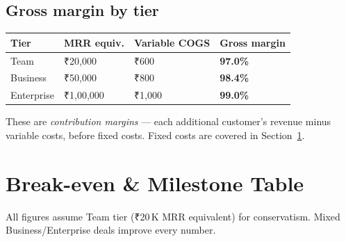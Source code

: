 \documentclass[12pt,a4paper]{article}
\begin{document}
\subsection{Gross margin by tier}

\begin{tabular}{@{}L{3.5cm}R{3cm}R{3.5cm}R{3cm}@{}}
  \toprule
  \textbf{Tier} & \textbf{MRR equiv.} & \textbf{Variable COGS} & \textbf{Gross margin} \\
  \midrule
  Team       & ₹20,000   & ₹600   & \textbf{97.0\%} \\
  Business   & ₹50,000   & ₹800   & \textbf{98.4\%} \\
  Enterprise & ₹1,00,000 & ₹1,000 & \textbf{99.0\%} \\
  \bottomrule
\end{tabular}

\vspace{0.5em}
These are \emph{contribution margins} --- each additional customer's revenue
minus variable costs, before fixed costs. Fixed costs are covered in
Section~\ref{sec:breakeven}.

\section{Break-even \& Milestone Table}
\label{sec:breakeven}

All figures assume Team tier (₹20\,K MRR equivalent) for conservatism.
Mixed Business/Enterprise deals improve every number.
\end{document}
